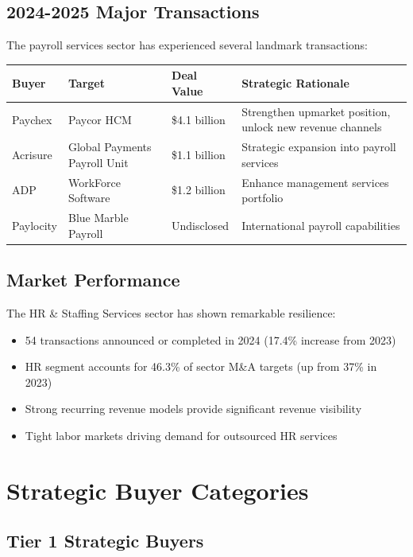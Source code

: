 \documentclass[12pt,a4paper]{article}
\begin{document}
\subsection{2024-2025 Major Transactions}

The payroll services sector has experienced several landmark transactions:

\begin{longtable}{p{3cm}p{3cm}p{2.5cm}p{5cm}}
\toprule
\textbf{Buyer} & \textbf{Target} & \textbf{Deal Value} & \textbf{Strategic Rationale} \\
\midrule
Paychex & Paycor HCM & \$4.1 billion & Strengthen upmarket position, unlock new revenue channels \\
\midrule
Acrisure & Global Payments Payroll Unit & \$1.1 billion & Strategic expansion into payroll services \\
\midrule
ADP & WorkForce Software & \$1.2 billion & Enhance management services portfolio \\
\midrule
Paylocity & Blue Marble Payroll & Undisclosed & International payroll capabilities \\
\bottomrule
\end{longtable}

\subsection{Market Performance}

The HR \& Staffing Services sector has shown remarkable resilience:
\begin{itemize}
    \item 54 transactions announced or completed in 2024 (17.4\% increase from 2023)
    \item HR segment accounts for 46.3\% of sector M\&A targets (up from 37\% in 2023)
    \item Strong recurring revenue models provide significant revenue visibility
    \item Tight labor markets driving demand for outsourced HR services
\end{itemize}

\section{Strategic Buyer Categories}

\subsection{Tier 1 Strategic Buyers}
\end{document}
